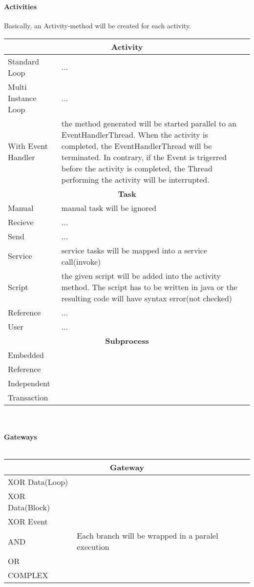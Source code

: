 \textbf{\large{Activities}}\\\\
Basically, an Activity-method will be created for each activity.  
	
		\begin{tabularx}{\linewidth}{|l|X|}\hline\hline
			\multicolumn{2}{|c|}{\textbf{Activity}}\\\hline\hline
			 Standard Loop & ... \\\hline
			 Multi Instance Loop & ... \\\hline
			 With Event Handler & the method generated will be started parallel to an EventHandlerThread. When the activity is completed, the EventHandlerThread will be terminated. In contrary, if the Event is trigerred before the activity is completed, the Thread performing the activity will be interrupted. \\\hline\hline	
				\multicolumn{2}{|c|}{\textbf{Task}}\\\hline\hline
					Manual & manual task will be ignored\\\hline
			 		Recieve & ...\\\hline
			 		Send & ...\\\hline
			 		Service & service tasks will be mapped into a service call(invoke)\\\hline
					Script & the given script will be added into the activity method. The script has to be written in java or the resulting code will have syntax error(not checked)\\\hline
			 		Reference & ... \\\hline
			 		User & ...\\\hline\hline
			 \multicolumn{2}{|c|}{\textbf{Subprocess}} \\\hline\hline
			 		Embedded & \\\hline
			 		Reference & \\\hline
					Independent & \\\hline
					Transaction & \\\hline\hline
		\end{tabularx}\\\\
		
	\textbf{\Large{Gateways}}\\\\
		\begin{tabularx}{\linewidth}{|l|X|}\hline\hline
		\multicolumn{2}{|c|}{\textbf{Gateway}}\\\hline\hline
		XOR Data(Loop) & \\\hline
		XOR Data(Block) & \\\hline
		XOR Event & \\\hline
		AND & Each branch will be wrapped in a paralel execution\\\hline
		OR & \\\hline
		COMPLEX & \\\hline\hline
		\end{tabularx}\\\\
		
